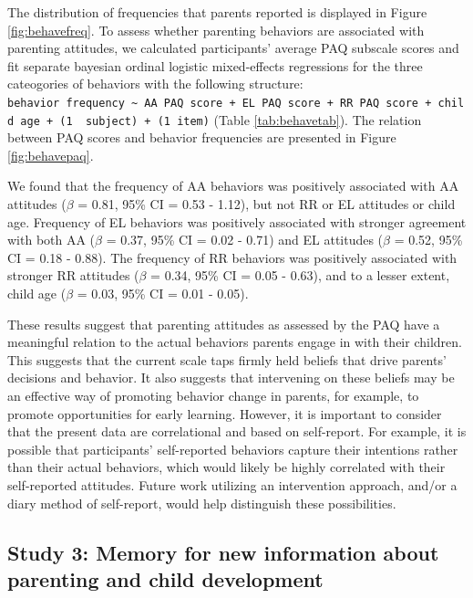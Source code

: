 \documentclass[floatsintext,man]{apa6}
\theoremstyle{definition}
\theoremstyle{definition}
\theoremstyle{definition}
\theoremstyle{remark}
\begin{document}
The distribution of frequencies that parents reported is displayed in
Figure \ref{fig:behavefreq}. To assess whether parenting behaviors are
associated with parenting attitudes, we calculated participants' average
PAQ subscale scores and fit separate bayesian ordinal logistic
mixed-effects regressions for the three cateogories of behaviors with
the following structure:
\texttt{behavior\ frequency\ \textasciitilde{}\ AA\ PAQ\ score\ +\ EL\ PAQ\ score\ +\ RR\ PAQ\ score\ +\ child\ age\ +\ (1\ \textbar{}\ subject)\ +\ (1\textbar{}\ item)}
(Table \ref{tab:behavetab}). The relation between PAQ scores and
behavior frequencies are presented in Figure \ref{fig:behavepaq}.

We found that the frequency of AA behaviors was positively associated
with AA attitudes (\(\beta\) = 0.81, 95\% CI = 0.53 - 1.12), but not RR
or EL attitudes or child age. Frequency of EL behaviors was positively
associated with stronger agreement with both AA (\(\beta\) = 0.37, 95\%
CI = 0.02 - 0.71) and EL attitudes (\(\beta\) = 0.52, 95\% CI = 0.18 -
0.88). The frequency of RR behaviors was positively associated with
stronger RR attitudes (\(\beta\) = 0.34, 95\% CI = 0.05 - 0.63), and to
a lesser extent, child age (\(\beta\) = 0.03, 95\% CI = 0.01 - 0.05).

These results suggest that parenting attitudes as assessed by the PAQ
have a meaningful relation to the actual behaviors parents engage in
with their children. This suggests that the current scale taps firmly
held beliefs that drive parents' decisions and behavior. It also
suggests that intervening on these beliefs may be an effective way of
promoting behavior change in parents, for example, to promote
opportunities for early learning. However, it is important to consider
that the present data are correlational and based on self-report. For
example, it is possible that participants' self-reported behaviors
capture their intentions rather than their actual behaviors, which would
likely be highly correlated with their self-reported attitudes. Future
work utilizing an intervention approach, and/or a diary method of
self-report, would help distinguish these possibilities.

\subsection{Study 3: Memory for new information about parenting and
child
development}\label{study-3-memory-for-new-information-about-parenting-and-child-development}
\end{document}
